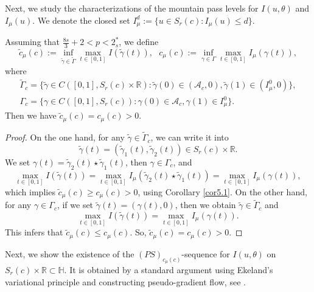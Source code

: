 \documentclass[reqno]{amsart}
\begin{document}
Next, we study the characterizations of the mountain pass levels for 
$I(u,\theta)$ and $I_\mu(u)$. We denote the closed set
$I^d_\mu:=\{u\in  S_{r}(c):I_\mu(u)\leq d\}$.

\begin{proposition}\label{pro5.1} 
Assuming that  $\frac{8s}{3}+2<p< 2^*_s$,  we define
$$
\tilde{c}_\mu (c):=\inf_{\tilde{\gamma}\in \tilde{\Gamma}}\max_{t\in[0,1]}
I(\tilde{\gamma}(t)),~~~{c}_\mu (c):=\inf_{{\gamma}\in{\Gamma}}
\max_{t\in[0,1]}I_{\mu}({\gamma}(t)),
$$
where
\begin{gather*}
\tilde{\Gamma}_c=\{\tilde{\gamma}\in C([0,1],  S_{r}(c)\times \mathbb{R}): 
\tilde{\gamma}(0)\in (\mathcal{A}_c, 0), \tilde{\gamma}(1)\in (I^0_\mu, 0)\},\\
{\Gamma}_c=\{{\gamma}\in C([0,1],  S_{r}(c)): {\gamma}(0)\in \mathcal{A}_c,
 {\gamma}(1)\in I^0_\mu\}.
\end{gather*}
Then we have 
$\tilde{c}_\mu (c)={c}_\mu (c)>0$.
\end{proposition}

\begin{proof}
 On the one hand, for any $\tilde{\gamma}\in \tilde{\Gamma}_c$, we can write  it into 
$$
\tilde{\gamma}(t)=(\tilde{\gamma}_1(t), \tilde{\gamma}_2(t))\in S_r(c)\times \mathbb{R}.
$$
We set ${\gamma}(t)=\tilde{\gamma}_2(t)\star \tilde{\gamma}_1(t)$, then 
${\gamma}\in {\Gamma}_c$, and
$$
 \max_{t\in[0,1]} I(\tilde{\gamma}(t))=\max_{t\in[0,1]} I_\mu(\tilde{\gamma}_2(t)
 \star \tilde{\gamma}_1(t))=\max_{t\in[0,1] } I_\mu({\gamma}(t)),
$$
which implies $\tilde{c}_\mu (c)\geq {c}_\mu (c)>0$, using Corollary \ref{cor5.1}. 
On the other hand, for any ${\gamma}\in {\Gamma}_c$, if we set
$\tilde{\gamma}(t)= ({\gamma}(t), 0)$, then we obtain 
$\tilde{\gamma}\in \tilde{\Gamma}_c$ and
$$
\max_{t\in[0,1]} I(\tilde{\gamma}(t))
=\max_{t\in[0,1] } I_\mu({\gamma}(t)).
$$
This infers that  $\tilde{c}_\mu (c)\leq {c}_\mu (c)$. So,  
$\tilde{c}_\mu (c)= {c}_\mu (c)>0$.
\end{proof}

Next, we show the existence of the $(PS)_{{c}_\mu (c)}$-sequence for $I(u, \theta)$ 
on $ S_{r}(c)\times \mathbb{R}\subset \mathbb{H}$. 
It is obtained by a standard argument using Ekeland's variational principle and
constructing pseudo-gradient flow, see \cite[Proposition 2.2]{J7888}.
\end{document}
